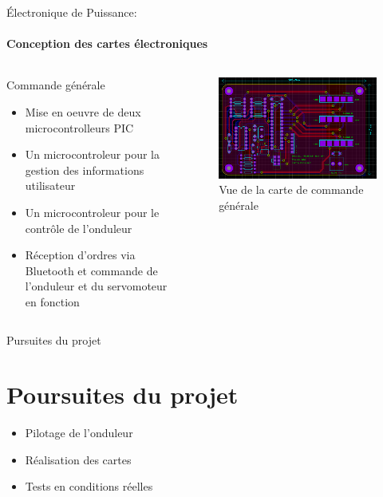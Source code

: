 \documentclass{beamer}
\begin{document}
	\begin{frame}{Électronique de Puissance:}
		\framesubtitle{ Conception des cartes électroniques}
		\begin{columns}[T]
	  		\begin{column}{0.5\textwidth}
	  			Commande générale
		    	\begin{itemize}
		    		\item Mise en oeuvre de deux microcontrolleurs PIC
		    		\item Un microcontroleur pour la gestion des informations utilisateur
		    		\item Un microcontroleur pour le contrôle de l'onduleur
		    		\item Réception d'ordres via Bluetooth et commande de l'onduleur et du servomoteur en fonction
		    	\end{itemize}
	  		\end{column}
	  		\begin{column}{0.5\textwidth}
	  			\begin{figure}
	  				\begin{center}
	  					\includegraphics[height=0.4\textheight]{../Illus/PCB_Onduleur.PNG}
	  				\end{center}
	    			\caption{Vue de la carte de commande générale}
	    		\end{figure}
	  		\end{column}
		\end{columns}
	\end{frame}
	
	\begin{frame}{Pursuites du projet}
		\section[Poursuites]{Poursuites du projet}
		\begin{itemize}
		    \item Pilotage de l'onduleur
		    \item Réalisation des cartes	
		    \item Tests en conditions réelles
		\end{itemize}
	\end{frame}
	
\end{document}
